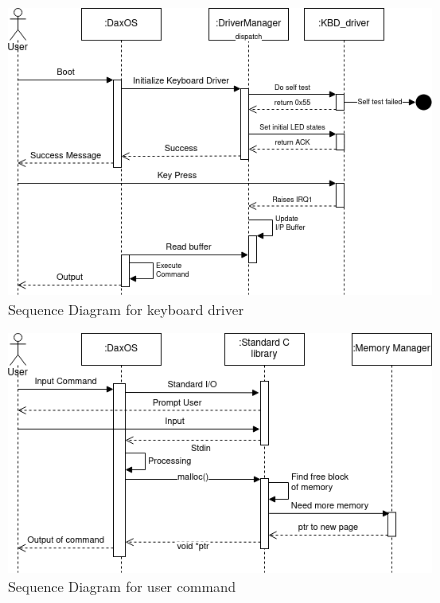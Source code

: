 \begin{figure}[h!]
	\includegraphics[width=\textwidth,height=\textheight,keepaspectratio]{kbd_driver}
	\caption{Sequence Diagram for keyboard driver}
\end{figure}
\clearpage

\hspace{0pt}
\vfill
\begin{figure}[h!]
	\includegraphics[width=\textwidth,height=\textheight,keepaspectratio]{user_command}
	\caption{Sequence Diagram for user command}
\end{figure}
\hspace{0pt}
\vfill

\pagebreak